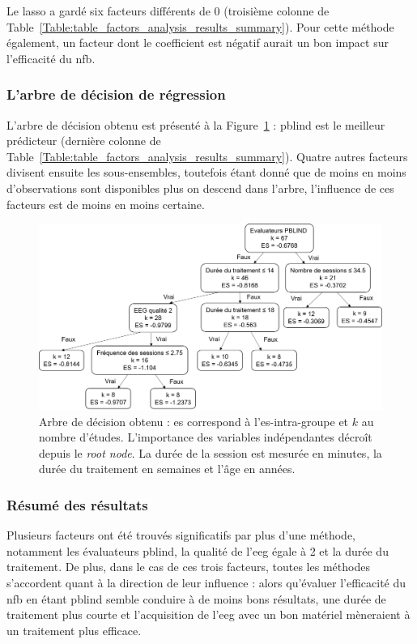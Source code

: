 Le \gls{lasso} a gardé six facteurs différents de 0 (troisième colonne de Table~\ref{Table:table_factors_analysis_results_summary}). Pour cette méthode également,
un facteur dont le coefficient est négatif aurait un bon impact sur l'efficacité du \gls{nfb}.

\subsubsection{L'arbre de décision de régression}

L'arbre de décision obtenu est présenté à la Figure~\ref{Figure:factors_decision_tree} : \gls{pblind} est le meilleur prédicteur (dernière colonne de 
Table~\ref{Table:table_factors_analysis_results_summary}). Quatre autres facteurs divisent ensuite les sous-ensembles, toutefois étant donné que de moins
en moins d'observations sont disponibles plus on descend dans l'arbre, l'influence de ces facteurs est de moins en moins certaine.

\begin{figure}[h!]
  \centering
	\includegraphics[width=1\linewidth]{figures/chapter-3/factors-decision-tree} 
  \caption{Arbre de décision obtenu : \gls{es} correspond à l'\gls{es}-intra-groupe et $k$ au nombre d'études. L'importance des variables indépendantes
	décroît depuis le \textit{root node}. La durée de la session est mesurée en minutes, la durée du traitement en semaines et l'âge en années.}
  \label{Figure:factors_decision_tree}
\end{figure}

\subsubsection{Résumé des résultats}

Plusieurs facteurs ont été trouvés significatifs par plus d'une méthode, notamment les évaluateurs \gls{pblind}, la qualité de l'\gls{eeg} égale à 2 et la durée du traitement. 
De plus, dans le cas de ces trois facteurs, toutes les méthodes s'accordent quant à la direction de leur influence : alors qu'évaluer l'efficacité du \gls{nfb} en étant \gls{pblind}
semble conduire à de moins bons résultats, une durée de traitement plus courte et l'acquisition de l'\gls{eeg} avec un bon matériel mèneraient à un traitement plus efficace. 

